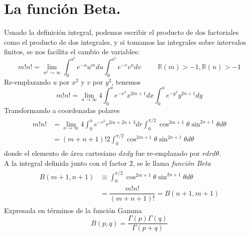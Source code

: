 \section{La función Beta.}
Usnado la definición integral, podemos escribir el producto de dos factoriales como el producto de dos integrales, y si tomamos las integrales sobre intervalos finitos, se nos facilita el cambio de variables:
\begin{equation}
m! n! = \lim_{a^{2} \to \infty} \int_{0}^{a^{2}} e^{-u} u^{m} du \int_{0}^{a^{2}} e^{-v} v^{n} dv \hspace{1cm} \mathbb{R}(m) > -1, \mathbb{R}(n) > -1
\label{eq:ecuacion_10_57a}
\end{equation}
Re-emplazando $u$ por $x^{2}$ y $v$ por $y^{2}$, tenemos
\begin{equation}
m! n! =  \lim_{a \to \infty} 4 \int_{0}^{a} e^{-x^{2}} x ^{2m+1} dx \int_{0}^{a} e^{-y^{2}} y^{2n+1} dy
\label{eq:ecuacion_10_57b}
\end{equation}
Transformando a coordenadas polares
\begin{eqnarray}
\begin{aligned}
m! n! &= \lim_{a \to \infty} 4 \int_{0}^{a} e^{-r^{2}} r^{2m+2n+3} dr \int_{0}^{\pi/2} \cos^{2m+1} \theta \sin^{2n+1} \theta d\theta \\
&= (m+n+1)! 2 \int_{0}^{\pi/2} \cos^{2m+1} \theta \sin^{2n+1} \theta d \theta
\label{eq:ecuacion_10_58}
\end{aligned}
\end{eqnarray}
donde el elemento de área cartesiano $dxdy$ fue re-emplazado por $r dr d\theta$.
\\
A la integral definida junto con el factor $2$, se le llama \emph{función Beta}
\begin{eqnarray}
\begin{aligned}
B(m+1,n+1) &\equiv \int_{0}^{\pi/2} \cos^{2m+1} \theta \sin^{2n+1} \theta d \theta \\
&= \dfrac{m! n!}{(m+n+1)!} = B(n+1,m+1)
\label{eq:ecuacion_10_59a}
\end{aligned}
\end{eqnarray}
Expresada en términos de la función Gamma
\begin{equation}
B(p,q) = \dfrac{\Gamma(p) \Gamma(q)}{\Gamma(p+q)}
\label{eq:ecuacion_10_59b}
\end{equation}
